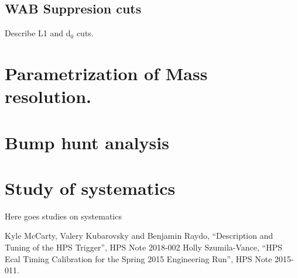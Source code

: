 \documentclass[letterpaper,12pt]{article}
\begin{document}
\subsection{WAB Suppresion cuts}
Describe L1 and $\mathrm{d_{0}}$ cuts.

\section{Parametrization of Mass resolution.}

\section{Bump hunt analysis}


\section{Study of systematics}
Here goes studies on systematics

\begin{thebibliography}{55}
  Kyle McCarty, Valery Kubarovsky and Benjamin Raydo, ``Description and Tuning of the HPS Trigger'', HPS Note 2018-002
  Holly Szumila-Vance, ``HPS Ecal Timing Calibration for the
Spring 2015 Engineering Run'', HPS Note 2015-011.
\end{thebibliography}

 
\end{document}
